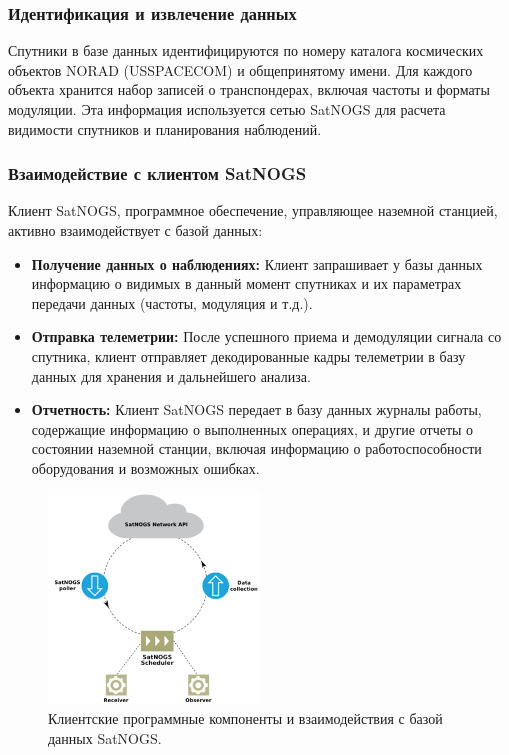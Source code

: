 \documentclass[14pt, a4paper]{../cls/coursework}
\begin{document}
    \subsubsection{Идентификация и извлечение данных}

    Спутники в базе данных идентифицируются по номеру каталога космических объектов NORAD (USSPACECOM) и общепринятому имени.
    Для каждого объекта хранится набор записей о транспондерах, включая частоты и форматы модуляции.
    Эта информация используется сетью SatNOGS для расчета видимости спутников и планирования наблюдений.

    \subsubsection{Взаимодействие с клиентом SatNOGS}

    Клиент SatNOGS, программное обеспечение, управляющее наземной станцией, активно взаимодействует с базой данных:

    \begin{itemize}
        \item \textbf{Получение данных о наблюдениях:} Клиент запрашивает у базы данных информацию о видимых в данный момент спутниках и их параметрах передачи данных (частоты, модуляция и т.д.).
        \item \textbf{Отправка телеметрии:} После успешного приема и демодуляции сигнала со спутника, клиент отправляет декодированные кадры телеметрии в базу данных для хранения и дальнейшего анализа.
        \item \textbf{Отчетность:} Клиент SatNOGS передает в базу данных журналы работы, содержащие информацию о выполненных операциях,  и другие отчеты о состоянии наземной станции, включая информацию о работоспособности оборудования и возможных ошибках.
    \end{itemize}

    \begin{figure}[htbp]
        \centering
        \includegraphics[width=0.5\textwidth]{satnogs_client_program_interactions}
        \caption{Клиентские программные компоненты и взаимодействия с базой данных SatNOGS.}
        \label{fig:satnogs_client_program_interactions}
    \end{figure}
\end{document}

